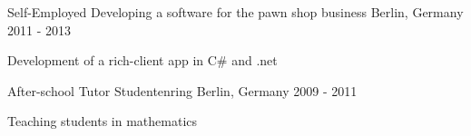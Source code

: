 \begin{cventries}
\cventry
{Self-Employed} %
{Developing a software for the pawn shop business} %
{Berlin, Germany} %
{2011 - 2013} %
{ %
\begin{cvitems}
\item {Development of a rich-client app in C\# and .net}
\end{cvitems}
}

\cventry
{After-school Tutor} %
{Studentenring} %
{Berlin, Germany} %
{2009 - 2011} %
{ %
\begin{cvitems}
\item {Teaching students in mathematics}
\end{cvitems}
}




\end{cventries}